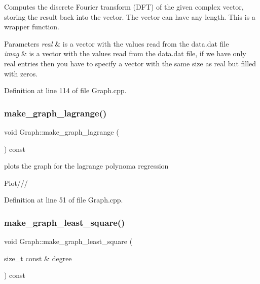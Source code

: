 Computes the discrete Fourier transform (D\+FT) of the given complex vector, storing the result back into the vector. The vector can have any length. This is a wrapper function. 


\begin{DoxyParams}{Parameters}
{\em real} & is a vector with the values read from the data.\+dat file \\
\hline
{\em imag} & is a vector with the values read from the data.\+dat file, if we have only real entries then you have to specify a vector with the same size as real but filled with zeros. \\
\hline
\end{DoxyParams}


Definition at line 114 of file Graph.\+cpp.

\mbox{\label{class_graph_a5fd01460d3981748a22269f9953d3486}} 
\subsubsection{\texorpdfstring{make\+\_\+graph\+\_\+lagrange()}{make\_graph\_lagrange()}}
{\footnotesize\ttfamily void Graph\+::make\+\_\+graph\+\_\+lagrange (\begin{DoxyParamCaption}{ }\end{DoxyParamCaption}) const}



plots the graph for the lagrange polynoma regression 

Plot/// 

Definition at line 51 of file Graph.\+cpp.

\mbox{\label{class_graph_af3560cb4e5eaa08c33e3de253a4e60a3}} 
\subsubsection{\texorpdfstring{make\+\_\+graph\+\_\+least\+\_\+square()}{make\_graph\_least\_square()}}
{\footnotesize\ttfamily void Graph\+::make\+\_\+graph\+\_\+least\+\_\+square (\begin{DoxyParamCaption}\item[{size\+\_\+t const \&}]{degree }\end{DoxyParamCaption}) const}



